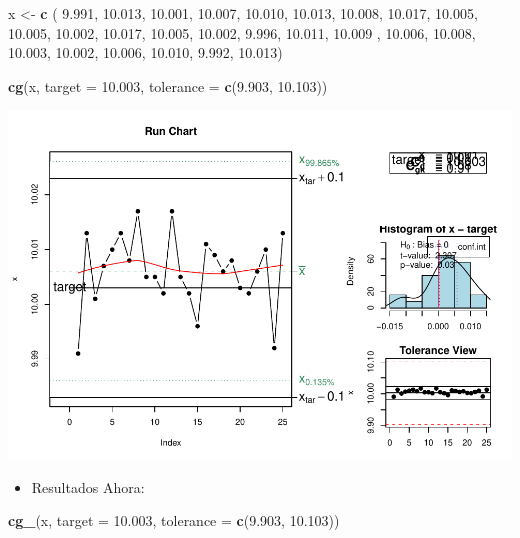 \documentclass[
]{book}
\newenvironment{Shaded}{\begin{snugshade}}{\end{snugshade}}
\newcommand{\AttributeTok}[1]{\textcolor[rgb]{0.13,0.29,0.53}{#1}}
\newcommand{\FloatTok}[1]{\textcolor[rgb]{0.00,0.00,0.81}{#1}}
\newcommand{\FunctionTok}[1]{\textcolor[rgb]{0.13,0.29,0.53}{\textbf{#1}}}
\newcommand{\NormalTok}[1]{#1}
\newcommand{\OtherTok}[1]{\textcolor[rgb]{0.56,0.35,0.01}{#1}}
\providecommand{\tightlist}{%
  \setlength{\itemsep}{0pt}\setlength{\parskip}{0pt}}
\begin{document}
\begin{Shaded}
\begin{Highlighting}[]
\NormalTok{x }\OtherTok{\textless{}{-}} \FunctionTok{c}\NormalTok{ ( }\FloatTok{9.991}\NormalTok{, }\FloatTok{10.013}\NormalTok{, }\FloatTok{10.001}\NormalTok{, }\FloatTok{10.007}\NormalTok{, }\FloatTok{10.010}\NormalTok{, }\FloatTok{10.013}\NormalTok{, }\FloatTok{10.008}\NormalTok{, }\FloatTok{10.017}\NormalTok{, }\FloatTok{10.005}\NormalTok{, }\FloatTok{10.005}\NormalTok{, }\FloatTok{10.002}\NormalTok{,}
         \FloatTok{10.017}\NormalTok{, }\FloatTok{10.005}\NormalTok{, }\FloatTok{10.002}\NormalTok{, }\FloatTok{9.996}\NormalTok{, }\FloatTok{10.011}\NormalTok{, }\FloatTok{10.009}\NormalTok{ , }\FloatTok{10.006}\NormalTok{, }\FloatTok{10.008}\NormalTok{, }\FloatTok{10.003}\NormalTok{, }\FloatTok{10.002}\NormalTok{, }\FloatTok{10.006}\NormalTok{, }
         \FloatTok{10.010}\NormalTok{, }\FloatTok{9.992}\NormalTok{, }\FloatTok{10.013}\NormalTok{)}

\FunctionTok{cg}\NormalTok{(x, }\AttributeTok{target =} \FloatTok{10.003}\NormalTok{, }\AttributeTok{tolerance =} \FunctionTok{c}\NormalTok{(}\FloatTok{9.903}\NormalTok{, }\FloatTok{10.103}\NormalTok{))}
\end{Highlighting}
\end{Shaded}

\includegraphics{Libro_TidyQualityTools_files/figure-latex/unnamed-chunk-153-1.pdf}

\begin{itemize}
\tightlist
\item
  Resultados Ahora:
\end{itemize}

\begin{Shaded}
\begin{Highlighting}[]
\FunctionTok{cg\_}\NormalTok{(x, }\AttributeTok{target =} \FloatTok{10.003}\NormalTok{, }\AttributeTok{tolerance =} \FunctionTok{c}\NormalTok{(}\FloatTok{9.903}\NormalTok{, }\FloatTok{10.103}\NormalTok{))}
\end{Highlighting}
\end{Shaded}
\end{document}
